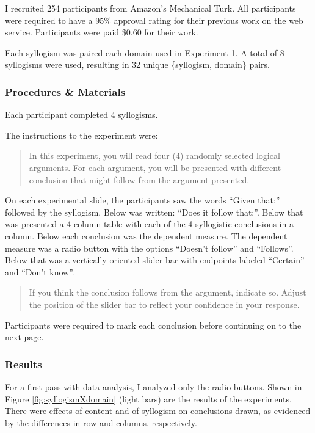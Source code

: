 \documentclass{llncs} %
\begin{document}
I recruited 254 participants from Amazon's Mechanical Turk. All participants were required to have a 95\% approval rating for their previous work on the web service. Participants were paid \$0.60 for their work.

Each syllogism was paired each domain used in Experiment 1. A total of 8 syllogisms were used, resulting in 32 unique \{syllogism, domain\} pairs.

\subsubsection{Procedures \& Materials}

Each participant completed 4 syllogisms. 

The instructions to the experiment were:

\begin{quotation}
In this experiment, you will read four (4) randomly selected logical arguments. For each argument, you will be presented with different conclusion that might follow from the argument presented.
\end{quotation}

On each experimental slide, the participants saw the words ``Given that:'' followed by the syllogism. Below was written: ``Does it follow that:''. Below that was presented a 4 column table with each of the 4 syllogistic conclusions in a column. Below each conclusion was the dependent measure. The dependent measure was a radio button with the options ``Doesn't follow'' and ``Follows''. Below that was a vertically-oriented slider bar with endpoints labeled ``Certain'' and ``Don't know''. 

\begin{quotation}
If you think the conclusion follows from the argument, indicate so. Adjust the position of the slider bar to reflect your confidence in your response.
\end{quotation}

Participants were required to mark each conclusion before continuing on to the next page.

\subsubsection{Results}

For a first pass with data analysis, I analyzed only the radio buttons. Shown in Figure \ref{fig:syllogismXdomain} (light bars) are the results of the experiments. There were effects of content and of syllogism on conclusions drawn, as evidenced by the differences in row and columns, respectively.
\end{document}
